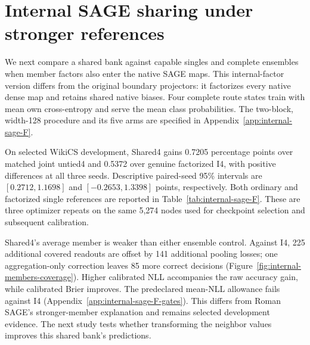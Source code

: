 \section{Internal SAGE sharing under stronger references}\label{sec:internal-sage}
We next compare a shared bank against capable singles and complete ensembles when member factors also enter the native SAGE maps. This internal-factor version differs from the original boundary projectors: it factorizes every native dense map and retains shared native biases. Four complete route states train with mean own cross-entropy and serve the mean class probabilities. The two-block, width-128 procedure and its five arms are specified in Appendix~\ref{app:internal-sage-F}.

On selected WikiCS development, Shared4 gains 0.7205 percentage points over matched joint untied4 and 0.5372 over genuine factorized I4, with positive differences at all three seeds. Descriptive paired-seed 95\% intervals are $[0.2712,1.1698]$ and $[-0.2653,1.3398]$ points, respectively. Both ordinary and factorized single references are reported in Table~\ref{tab:internal-sage-F}. These are three optimizer repeats on the same 5,274 nodes used for checkpoint selection and subsequent calibration.

Shared4's average member is weaker than either ensemble control. Against I4, 225 additional covered readouts are offset by 141 additional pooling losses; one aggregation-only correction leaves 85 more correct decisions (Figure~\ref{fig:internal-members-coverage}). Higher calibrated NLL accompanies the raw accuracy gain, while calibrated Brier improves. The predeclared mean-NLL allowance fails against I4 (Appendix~\ref{app:internal-sage-F-gates}). This differs from Roman SAGE's stronger-member explanation and remains selected development evidence. The next study tests whether transforming the neighbor values improves this shared bank's predictions.
